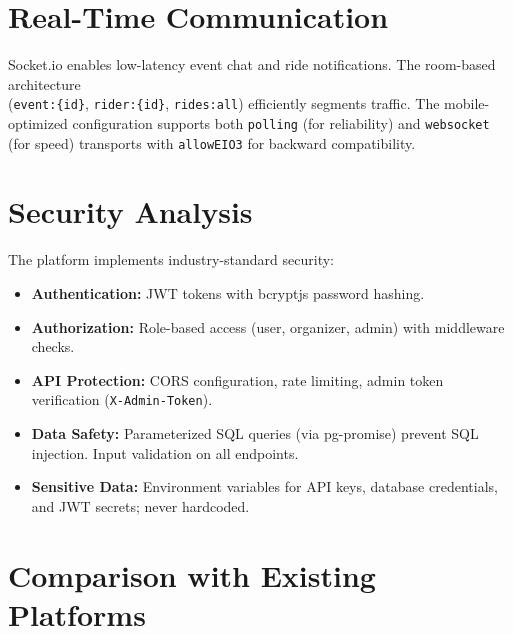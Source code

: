 \section{Real-Time Communication}
Socket.io enables low-latency event chat and ride notifications. The room-based architecture \\ (\texttt{event:\{id\}}, \texttt{rider:\{id\}}, \texttt{rides:all}) efficiently segments traffic. The mobile-optimized configuration supports both \texttt{polling} (for reliability) and \texttt{websocket} (for speed) transports with \texttt{allowEIO3} for backward compatibility.

\section{Security Analysis}
The platform implements industry-standard security:
\begin{itemize}[noitemsep]
    \item \textbf{Authentication:} JWT tokens with bcryptjs password hashing.
    \item \textbf{Authorization:} Role-based access (user, organizer, admin) with middleware checks.
    \item \textbf{API Protection:} CORS configuration, rate limiting, admin token verification (\texttt{X-Admin-Token}).
    \item \textbf{Data Safety:} Parameterized SQL queries (via pg-promise) prevent SQL injection. Input validation on all endpoints.
    \item \textbf{Sensitive Data:} Environment variables for API keys, database credentials, and JWT secrets; never hardcoded.
\end{itemize}

\section{Comparison with Existing Platforms}

